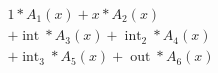\documentclass[preview]{standalone}
\begin{document}
\begin{align*}
1 *A_1(x) + x *A_2(x) \\+ \operatorname{int } *A_3(x)  +  \operatorname{int}_2 *A_4(x)\\  +  \operatorname{int}_3 *A_5(x)  +  \operatorname{out } *A_6(x)
\end{align*}
\end{document}
